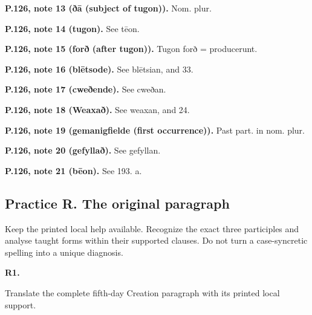 \textbf{P.126, note 13 (ðā (subject of tugon)).} Nom. plur.

\textbf{P.126, note 14 (tugon).} See tēon.

\textbf{P.126, note 15 (forð (after tugon)).} Tugon forð = producerunt.

\textbf{P.126, note 16 (blētsode).} See blētsian, and 33.

\textbf{P.126, note 17 (cweðende).} See cweðan.

\textbf{P.126, note 18 (Weaxað).} See weaxan, and 24.

\textbf{P.126, note 19 (gemanigfielde (first occurrence)).} Past part. in nom. plur.

\textbf{P.126, note 20 (gefyllað).} See gefyllan.

\textbf{P.126, note 21 (bēon).} See 193. a.

\subsection*{Practice R. The original paragraph}

Keep the printed local help available. Recognize the exact three participles and analyse taught forms within their supported clauses. Do not turn a case-syncretic spelling into a unique diagnosis.

\par\begin{minipage}{\linewidth}\raggedright
\textbf{R1.}

Translate the complete fifth-day Creation paragraph with its printed local support.

\end{minipage}\par\addvspace{4pt}

